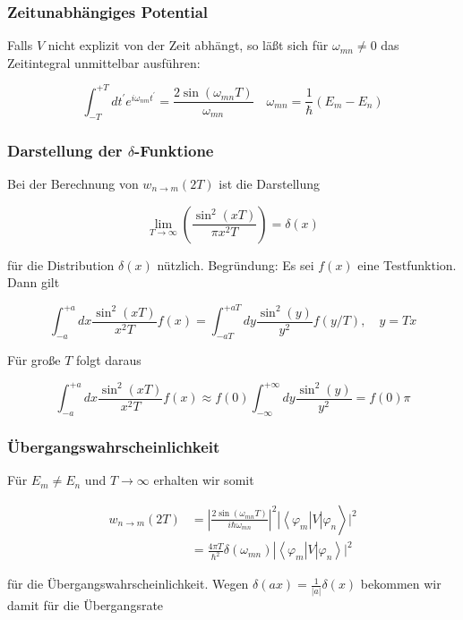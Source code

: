 \documentclass[10pt, letterpaper]{article}
\begin{document}
\subsubsection*{Zeitunabhängiges Potential}
Falls $V$ nicht explizit von der Zeit abhängt, so läßt sich für $\omega_{m n} \neq 0$ das Zeitintegral unmittelbar ausführen:

$$
\int_{-T}^{+T} d t^{\prime} e^{i \omega_{n m} t^{\prime}}=\frac{2 \sin \left(\omega_{m n} T\right)}{\omega_{m n}} \quad \omega_{m n}=\frac{1}{\hbar}\left(E_{m}-E_{n}\right)
$$

\subsubsection*{Darstellung der $\delta$-Funktione}
Bei der Berechnung von $w_{n \rightarrow m}(2 T)$ ist die Darstellung

$$
\lim _{T \rightarrow \infty}\left(\frac{\sin ^{2}(x T)}{\pi x^{2} T}\right)=\delta(x)
$$

für die Distribution $\delta(x)$ nützlich. Begründung: Es sei $f(x)$ eine Testfunktion. Dann gilt

$$
\int_{-a}^{+a} d x \frac{\sin ^{2}(x T)}{x^{2} T} f(x)=\int_{-a T}^{+a T} d y \frac{\sin ^{2}(y)}{y^{2}} f(y / T), \quad y=T x
$$

Für große $T$ folgt daraus

$$
\int_{-a}^{+a} d x \frac{\sin ^{2}(x T)}{x^{2} T} f(x) \approx f(0) \int_{-\infty}^{+\infty} d y \frac{\sin ^{2}(y)}{y^{2}}=f(0) \pi
$$

\subsubsection*{Übergangswahrscheinlichkeit}
Für $E_{m} \neq E_{n}$ und $T \rightarrow \infty$ erhalten wir somit

$$
\begin{aligned}
w_{n \rightarrow m}(2 T) & \left.=\left|\frac{2 \sin \left(\omega_{m n} T\right)}{i \hbar \omega_{m n}}\right|^{2}\left|\left\langle\varphi_{m}\right| V\right| \varphi_{n}\right\rangle\left.\right|^{2} \\
& \left.=\frac{4 \pi T}{\hbar^{2}} \delta\left(\omega_{m n}\right)\left|\left\langle\varphi_{m}\right| V\right| \varphi_{n}\right\rangle\left.\right|^{2}
\end{aligned}
$$

für die Übergangswahrscheinlichkeit. Wegen $\delta(a x)=\frac{1}{|a|} \delta(x)$ bekommen wir damit für die Übergangsrate
\end{document}
